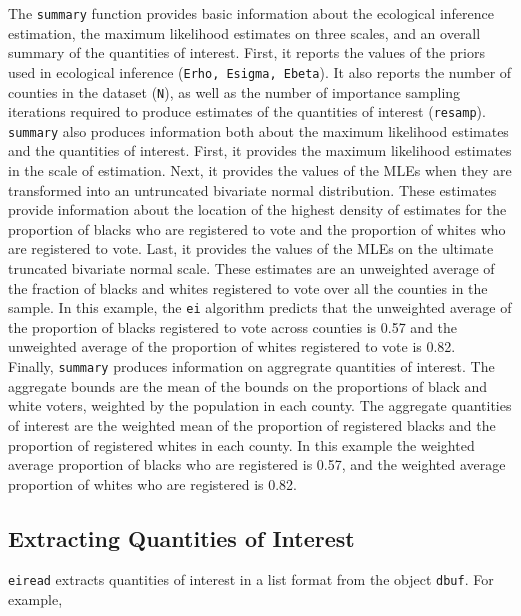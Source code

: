 \documentclass[11pt,oneside,letterpaper,titlepage]{article}
\begin{document}
\noindent The \verb#summary# function provides basic information about the ecological inference estimation, the maximum likelihood estimates on three scales, and an overall summary of the quantities of interest.  First, it reports the values of the priors used in ecological inference (\verb#Erho, Esigma, Ebeta#).  It also reports the number of counties in the dataset (\verb#N#), as well as the number of importance sampling iterations required to produce estimates of the quantities of interest (\verb#resamp#).  \\
\newline
\verb#summary# also produces information both about the maximum likelihood estimates and the quantities of interest.  First, it provides the maximum likelihood estimates in the scale of estimation. Next, it provides the values of the MLEs when they are transformed into an untruncated bivariate normal distribution.  These estimates provide information about the location of the highest density of estimates for the proportion of blacks who are registered to vote and the proportion of whites who are registered to vote.  Last, it provides the values of the MLEs on the ultimate truncated bivariate normal scale.  These estimates are an unweighted average of the fraction of blacks and whites registered to vote over all the counties in the sample.  In this example, the \verb#ei# algorithm predicts that the unweighted average of the proportion of blacks registered to vote across counties is 0.57 and the unweighted average of the proportion of whites registered to vote is 0.82.\\
\newline
Finally, \verb#summary# produces information on aggregrate quantities of interest.  The aggregate bounds are the mean of the bounds on the proportions of black and white voters, weighted by the population in each county.  The aggregate quantities of interest are the weighted mean of the proportion of registered blacks and the proportion of registered whites in each county.  In this example the weighted average proportion of blacks who are registered is 0.57, and the weighted average proportion of whites who are registered is 0.82.  

\subsection{Extracting Quantities of Interest}

\verb#eiread# extracts quantities of interest in a list format from the object \verb#dbuf#.  For example, 
\end{document}
